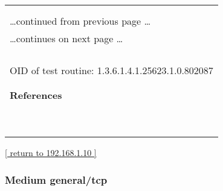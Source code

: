\documentclass{article}
\begin{document}
\begin{longtable}{|p{}|}
\hline
\rowcolor{openvas_warning}{\color{white}{Medium (CVSS: 4.3) }}\\
\rowcolor{openvas_warning}{\color{white}{NVT: POODLE SSLv3 Protocol CBC ciphers Information Disclosure Vulnerability}}\\
\hline
\endfirsthead
\hfill\ldots continued from previous page \ldots \\
\hline
\endhead
\hline
\ldots continues on next page \ldots \\
\endfoot
\hline
\endlastfoot
\\
\rowcolor{white}{\verb==}\\
\rowcolor{white}{\verb==}\\
\\
OID of test routine: 1.3.6.1.4.1.25623.1.0.802087\\
\\

      \hline
      \\
\textbf{References}\\
\rowcolor{white}{\verb=CVE: CVE-2014-3566=}\\
\rowcolor{white}{\verb=BID:70574=}\\
\rowcolor{white}{\verb=Other:=}\\
\rowcolor{white}{\verb=  URL:http://osvdb.com/113251=}\\
\rowcolor{white}{\verb=   URL:https://www.openssl.org/~bodo/ssl-poodle.pdf=}\\
\rowcolor{white}{\verb=   URL:https://www.imperialviolet.org/2014/10/14/poodle.html=}\\
\rowcolor{white}{\verb=   URL:https://www.dfranke.us/posts/2014-10-14-how-poodle-happened.html=}\\
\rowcolor{white}{\verb=   URL:http://googleonlinesecurity.blogspot.in/2014/10/this-poodle-bites-exploit=}\\
\rowcolor{white}{$\hookrightarrow$\verb=ing-ssl-30.html=}\\
\end{longtable}

\begin{footnotesize}\hyperref[host:192.168.1.10]{[ return to 192.168.1.10 ]}\end{footnotesize}
\subsubsection{Medium general/tcp}
\label{port:192.168.1.10 general/tcp Medium}
\end{document}
